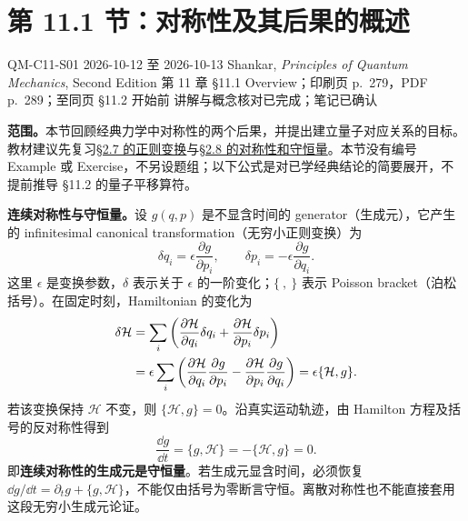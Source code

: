 \section{第 11.1 节：对称性及其后果的概述}
\label{section:QM-C11-S01}
\studymeta
  {QM-C11-S01}
  {2026-10-12 至 2026-10-13}
  {Shankar, \textit{Principles of Quantum Mechanics}, Second Edition}
  {第 11 章 \S 11.1 Overview；印刷页 p.~279，PDF p.~289；至同页 \S 11.2 开始前}
  {讲解与概念核对已完成；笔记已确认}

\textbf{范围。}本节回顾经典力学中对称性的两个后果，并提出建立量子对应关系的目标。教材建议先复习\hyperref[section:QM-C02-S07]{\S 2.7 的正则变换}与\hyperref[section:QM-C02-S08]{\S 2.8 的对称性和守恒量}。本节没有编号 Example 或 Exercise，不另设题组；以下公式是对已学经典结论的简要展开，不提前推导 \S 11.2 的量子平移算符。


\textbf{连续对称性与守恒量。}设 $g(q,p)$ 是不显含时间的 generator（生成元），它产生的 infinitesimal canonical transformation（无穷小正则变换）为
\begin{equation}
  \delta q_i=\epsilon\frac{\partial g}{\partial p_i},\qquad
  \delta p_i=-\epsilon\frac{\partial g}{\partial q_i}.
\end{equation}
这里 $\epsilon$ 是变换参数，$\delta$ 表示关于 $\epsilon$ 的一阶变化；$\{\ ,\ \}$ 表示 Poisson bracket（泊松括号）。在固定时刻，Hamiltonian 的变化为
\begin{align}
  \delta\mathcal H
  &=\sum_i\left(
      \frac{\partial\mathcal H}{\partial q_i}\delta q_i
     +\frac{\partial\mathcal H}{\partial p_i}\delta p_i\right)\notag\\
  &=\epsilon\sum_i\left(
      \frac{\partial\mathcal H}{\partial q_i}\frac{\partial g}{\partial p_i}
     -\frac{\partial\mathcal H}{\partial p_i}\frac{\partial g}{\partial q_i}\right)
   =\epsilon\{\mathcal H,g\}.
\end{align}
若该变换保持 $\mathcal H$ 不变，则 $\{\mathcal H,g\}=0$。沿真实运动轨迹，由 Hamilton 方程及括号的反对称性得到
\begin{equation}
  \boxed{\frac{\dd g}{\dd t}=\{g,\mathcal H\}
    =-\{\mathcal H,g\}=0}.
  \label{eq:QM-C11-S01-conserved-generator}
\end{equation}
即\textbf{连续对称性的生成元是守恒量}。若生成元显含时间，必须恢复 $\dd g/\dd t=\partial_tg+\{g,\mathcal H\}$，不能仅由括号为零断言守恒。离散对称性也不能直接套用这段无穷小生成元论证。

